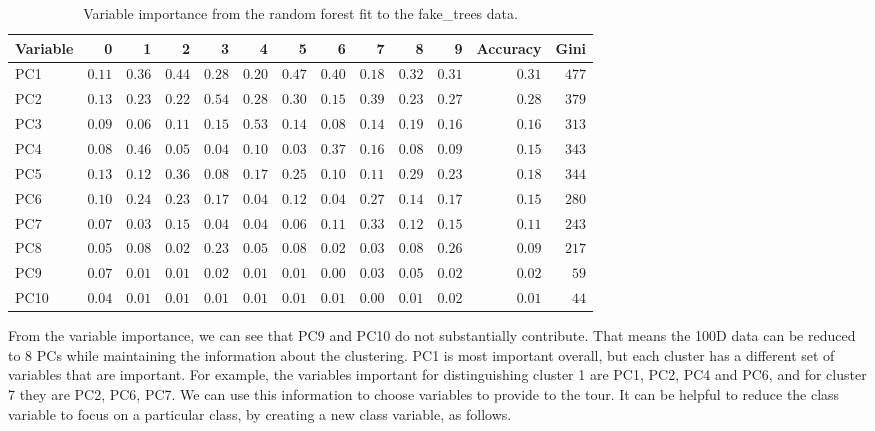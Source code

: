 \documentclass[
  letterpaper,
]{book}
\begin{document}
\hypertarget{tbl-ft-importance}{}
\begin{longtable}{lrrrrrrrrrrrr}
\caption{\label{tbl-ft-importance}Variable importance from the random forest fit to the fake\_trees data. }\tabularnewline

\toprule
Variable & 0 & 1 & 2 & 3 & 4 & 5 & 6 & 7 & 8 & 9 & Accuracy & Gini \\ 
\midrule
PC1 & $0.11$ & $0.36$ & $0.44$ & $0.28$ & $0.20$ & $0.47$ & $0.40$ & $0.18$ & $0.32$ & $0.31$ & $0.31$ & $477$ \\ 
PC2 & $0.13$ & $0.23$ & $0.22$ & $0.54$ & $0.28$ & $0.30$ & $0.15$ & $0.39$ & $0.23$ & $0.27$ & $0.28$ & $379$ \\ 
PC3 & $0.09$ & $0.06$ & $0.11$ & $0.15$ & $0.53$ & $0.14$ & $0.08$ & $0.14$ & $0.19$ & $0.16$ & $0.16$ & $313$ \\ 
PC4 & $0.08$ & $0.46$ & $0.05$ & $0.04$ & $0.10$ & $0.03$ & $0.37$ & $0.16$ & $0.08$ & $0.09$ & $0.15$ & $343$ \\ 
PC5 & $0.13$ & $0.12$ & $0.36$ & $0.08$ & $0.17$ & $0.25$ & $0.10$ & $0.11$ & $0.29$ & $0.23$ & $0.18$ & $344$ \\ 
PC6 & $0.10$ & $0.24$ & $0.23$ & $0.17$ & $0.04$ & $0.12$ & $0.04$ & $0.27$ & $0.14$ & $0.17$ & $0.15$ & $280$ \\ 
PC7 & $0.07$ & $0.03$ & $0.15$ & $0.04$ & $0.04$ & $0.06$ & $0.11$ & $0.33$ & $0.12$ & $0.15$ & $0.11$ & $243$ \\ 
PC8 & $0.05$ & $0.08$ & $0.02$ & $0.23$ & $0.05$ & $0.08$ & $0.02$ & $0.03$ & $0.08$ & $0.26$ & $0.09$ & $217$ \\ 
PC9 & $0.07$ & $0.01$ & $0.01$ & $0.02$ & $0.01$ & $0.01$ & $0.00$ & $0.03$ & $0.05$ & $0.02$ & $0.02$ & $59$ \\ 
PC10 & $0.04$ & $0.01$ & $0.01$ & $0.01$ & $0.01$ & $0.01$ & $0.01$ & $0.00$ & $0.01$ & $0.02$ & $0.01$ & $44$ \\ 
\bottomrule
\end{longtable}

From the variable importance, we can see that PC9 and PC10 do not
substantially contribute. That means the 100D data can be reduced to 8
PCs while maintaining the information about the clustering. PC1 is most
important overall, but each cluster has a different set of variables
that are important. For example, the variables important for
distinguishing cluster 1 are PC1, PC2, PC4 and PC6, and for cluster 7
they are PC2, PC6, PC7. We can use this information to choose variables
to provide to the tour. It can be helpful to reduce the class variable
to focus on a particular class, by creating a new class variable, as
follows.
\end{document}
